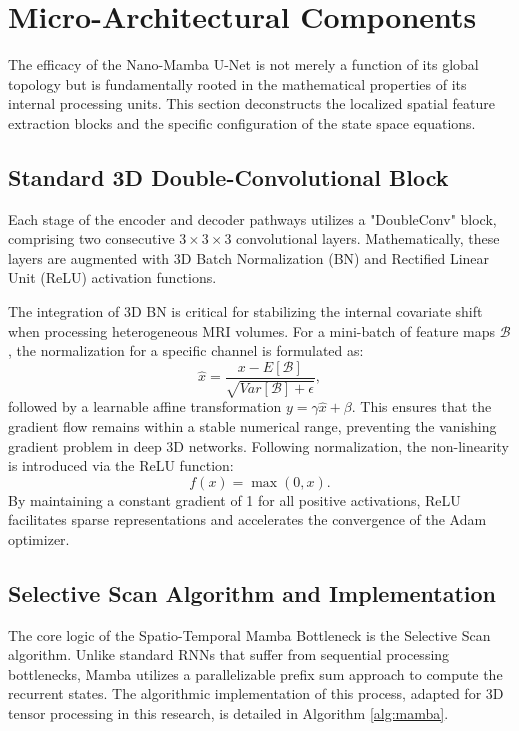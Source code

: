 
\section{Micro-Architectural Components}
The efficacy of the Nano-Mamba U-Net is not merely a function of its global topology but is fundamentally rooted in the mathematical properties of its internal processing units. This section deconstructs the localized spatial feature extraction blocks and the specific configuration of the state space equations.

\subsection{Standard 3D Double-Convolutional Block}
Each stage of the encoder and decoder pathways utilizes a "DoubleConv" block, comprising two consecutive $3 \times 3 \times 3$ convolutional layers. Mathematically, these layers are augmented with 3D Batch Normalization (BN) \cite{ioffe2015batch} and Rectified Linear Unit (ReLU) activation functions. 

The integration of 3D BN is critical for stabilizing the internal covariate shift when processing heterogeneous MRI volumes. For a mini-batch of feature maps $\mathcal{B}$, the normalization for a specific channel is formulated as:
\begin{equation}
    \hat{x} = \frac{x - E[\mathcal{B}]}{\sqrt{Var[\mathcal{B}] + \epsilon}},
\end{equation}
followed by a learnable affine transformation $y = \gamma \hat{x} + \beta$. This ensures that the gradient flow remains within a stable numerical range, preventing the vanishing gradient problem in deep 3D networks. Following normalization, the non-linearity is introduced via the ReLU function:
\begin{equation}
    f(x) = \max(0, x).
\end{equation}
By maintaining a constant gradient of 1 for all positive activations, ReLU facilitates sparse representations and accelerates the convergence of the Adam optimizer.

\subsection{Selective Scan Algorithm and Implementation}
The core logic of the Spatio-Temporal Mamba Bottleneck is the Selective Scan algorithm. Unlike standard RNNs that suffer from sequential processing bottlenecks, Mamba utilizes a parallelizable prefix sum approach to compute the recurrent states. The algorithmic implementation of this process, adapted for 3D tensor processing in this research, is detailed in Algorithm \ref{alg:mamba}.

